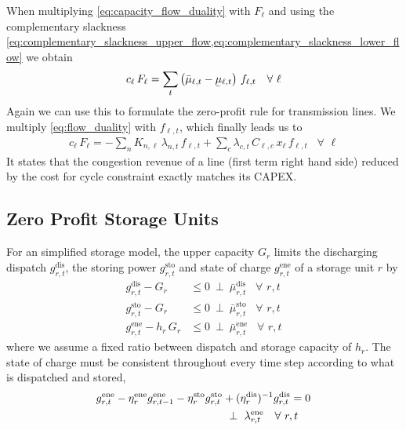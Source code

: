 \documentclass[11pt,twocolumn]{article}
\newcommand{\ubar}[1]{\underaccent{\bar}{#1}}
\newcommand{\resultsin}[1]{\hspace{6pt} \bot  \hspace{6pt} #1}
\newcommand{\Forall}[1]{\hspace{10pt} \forall \,\, #1 }
\newcommand{\pdv}[2]{\frac{\partial #1}{\partial #2}}
\newcommand{\flow}{f_{\ell,t}}
\newcommand{\capacityflow}{F_{\ell}}
\newcommand{\capitalpriceflow}{c_{\ell}}
\newcommand{\mulowerflow}{\ubar{\mu}_{\ell,t}}
\newcommand{\muupperflow}{\bar{\mu}_{\ell,t}}
\newcommand{\storage}{g_{r,t}}
\newcommand{\storagedispatch}{\storage^\text{dis}}
\newcommand{\storagecharge}{\storage^\text{sto}}
\newcommand{\storagesoc}{\storage^\text{ene}}
\newcommand{\storageprevioussoc}{g_{r,t-1}^\text{ene}}
\newcommand{\efficiency}{\eta_{r}}
\newcommand{\efficiencydispatch}{\efficiency^\text{dis}}
\newcommand{\efficiencycharge}{\efficiency^\text{sto}}
\newcommand{\efficiencysoc}{\efficiency^\text{ene}}
\newcommand{\capitalpricestorage}{c_r}
\newcommand{\capacitystorage}{G_r}
\newcommand{\muupperstoragedispatch}{\bar{\mu}_{r,t}^\text{dis}}
\newcommand{\muupperstoragecharge}{\bar{\mu}_{r,t}^\text{sto}}
\newcommand{\muupperstoragesoc}{\bar{\mu}_{r,t}^\text{ene}}
\newcommand{\mustateofcharge}{\lambda^\text{ene}_{r,t}}
\newcommand{\lagrangian}{\mathcal{L}}
\newcommand{\lmp}[1][n]{\lambda_{#1,t}}
\newcommand{\incidence}[1][n]{K_{#1,\ell}}
\newcommand{\cycle}{C_{\ell,c}}
\newcommand{\reactance}{x_\ell}
\newcommand{\cycleprice}{\lambda_{c,t}}
\begin{document}
    
When multiplying \cref{eq:capacity_flow_duality} with $\capacityflow$ and using the complementary slackness \cref{eq:complementary_slackness_upper_flow,eq:complementary_slackness_lower_flow} we obtain 
\begin{align}
 \capitalpriceflow \, \capacityflow = \sum_t \left( \muupperflow - \mulowerflow \right)  \, \flow \Forall{\ell} 
 \label{eq:capital_price_flow_sum}
\end{align}
Again we can use this to formulate the zero-profit rule for transmission lines. We multiply \cref{eq:flow_duality} with $\flow$, which finally leads us to 
\begin{align}
\capitalpriceflow \, \capacityflow = - \sum_n \incidence\, \lmp\, \flow + \sum_c \cycleprice\, \cycle\, \reactance\, \flow 
\Forall{\ell} \end{align}
It states that the congestion revenue of a line (first term right hand side) reduced by the cost for cycle constraint exactly matches its CAPEX. 


\subsection{Zero Profit Storage Units}
\label{sec:zero_profit_storage_units}

For an simplified storage model, the upper capacity $\capacitystorage$ limits the discharging dispatch $\storagedispatch$, the storing power $\storagecharge$ and state of charge $\storagesoc$ of a storage unit $r$ by 
\begin{align}
    \storagedispatch - \capacitystorage &\le 0  \resultsin{\muupperstoragedispatch} \Forall{r,t} \\
    \storagecharge - \capacitystorage &\le 0  \resultsin{\muupperstoragecharge} \Forall{r,t} \\
    \storagesoc - h_r \, \capacitystorage &\le 0  \resultsin{\muupperstoragesoc} \Forall{r,t}
\end{align}
where we assume a fixed ratio between dispatch and storage capacity of $h_r$. 
The state of charge must be consistent throughout every time step according to what is dispatched and stored, 
\begin{align}
    \notag
    \storagesoc - \efficiencysoc \storageprevioussoc - \efficiencycharge \storagecharge &+ (\efficiencydispatch)^{-1} \storagedispatch = 0 \\
    &\resultsin{\mustateofcharge} \Forall{r,t}
\end{align}
\end{document}
